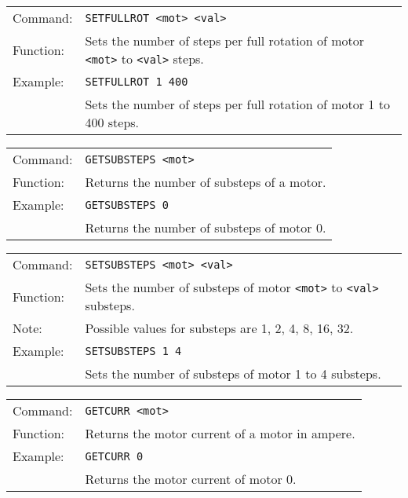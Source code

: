 \vspace{\vdistace}

\begin{table}[h]
  \begin{tabularx}{\textwidth}{lX}
    Command:  & \texttt{SETFULLROT <mot> <val>}\\
    Function: & Sets the number of steps per full rotation of motor \texttt{<mot>} to \texttt{<val>} steps.\\
    Example:  & \texttt{SETFULLROT 1 400}\\
              & Sets the number of steps per full rotation of motor 1 to 400 steps.
  \end{tabularx}
\end{table}

\vspace{\vdistace}

\begin{table}[h]
  \begin{tabularx}{\textwidth}{lX}
    Command:  & \texttt{GETSUBSTEPS <mot>}\\
    Function: & Returns the number of substeps of a motor.\\
    Example:  & \texttt{GETSUBSTEPS 0}\\
              & Returns the number of substeps of motor 0.
  \end{tabularx}
\end{table}

\vspace{\vdistace}

\begin{table}[h]
  \begin{tabularx}{\textwidth}{lX}
    Command:  & \texttt{SETSUBSTEPS <mot> <val>}\\
    Function: & Sets the number of substeps of motor \texttt{<mot>} to \texttt{<val>} substeps.\\
    Note:     & Possible values for substeps are 1, 2, 4, 8, 16, 32.\\
    Example:  & \texttt{SETSUBSTEPS 1 4}\\
              & Sets the number of substeps of motor 1 to 4 substeps.
  \end{tabularx}
\end{table}

\vspace{\vdistace}

\begin{table}[h]
  \begin{tabularx}{\textwidth}{lX}
    Command:  & \texttt{GETCURR <mot>}\\
    Function: & Returns the motor current of a motor in ampere.\\
    Example:  & \texttt{GETCURR 0}\\
              & Returns the motor current of motor 0.
  \end{tabularx}
\end{table}

